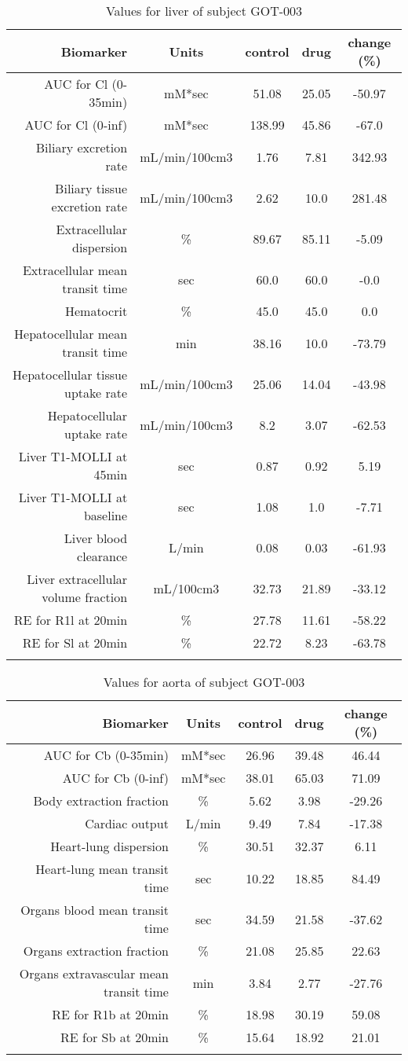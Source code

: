 \documentclass{epflreport}%
\begin{document}
%
\clearpage%
\begin{longtable}{rcccc}%
\hline%
Biomarker&Units&control&drug&change (\%)\\%
\hline%
AUC for Cl (0{-}35min)&mM*sec&51.08&25.05&{-}50.97\\%
AUC for Cl (0{-}inf)&mM*sec&138.99&45.86&{-}67.0\\%
Biliary excretion rate&mL/min/100cm3&1.76&7.81&342.93\\%
Biliary tissue excretion rate&mL/min/100cm3&2.62&10.0&281.48\\%
Extracellular dispersion&\%&89.67&85.11&{-}5.09\\%
Extracellular mean transit time&sec&60.0&60.0&{-}0.0\\%
Hematocrit&\%&45.0&45.0&0.0\\%
Hepatocellular mean transit time&min&38.16&10.0&{-}73.79\\%
Hepatocellular tissue uptake rate&mL/min/100cm3&25.06&14.04&{-}43.98\\%
Hepatocellular uptake rate&mL/min/100cm3&8.2&3.07&{-}62.53\\%
Liver T1{-}MOLLI at 45min&sec&0.87&0.92&5.19\\%
Liver T1{-}MOLLI at baseline&sec&1.08&1.0&{-}7.71\\%
Liver blood clearance&L/min&0.08&0.03&{-}61.93\\%
Liver extracellular volume fraction&mL/100cm3&32.73&21.89&{-}33.12\\%
RE for R1l at 20min&\%&27.78&11.61&{-}58.22\\%
RE for Sl at 20min&\%&22.72&8.23&{-}63.78\\%
\hline%
\caption{Values for liver of subject GOT-003} \\%
\end{longtable}%
\begin{longtable}{rcccc}%
\hline%
Biomarker&Units&control&drug&change (\%)\\%
\hline%
AUC for Cb (0{-}35min)&mM*sec&26.96&39.48&46.44\\%
AUC for Cb (0{-}inf)&mM*sec&38.01&65.03&71.09\\%
Body extraction fraction&\%&5.62&3.98&{-}29.26\\%
Cardiac output&L/min&9.49&7.84&{-}17.38\\%
Heart{-}lung dispersion&\%&30.51&32.37&6.11\\%
Heart{-}lung mean transit time&sec&10.22&18.85&84.49\\%
Organs blood mean transit time&sec&34.59&21.58&{-}37.62\\%
Organs extraction fraction&\%&21.08&25.85&22.63\\%
Organs extravascular mean transit time&min&3.84&2.77&{-}27.76\\%
RE for R1b at 20min&\%&18.98&30.19&59.08\\%
RE for Sb at 20min&\%&15.64&18.92&21.01\\%
\hline%
\caption{Values for aorta of subject GOT-003} \\%
\end{longtable}%
\clearpage%
\end{document}

